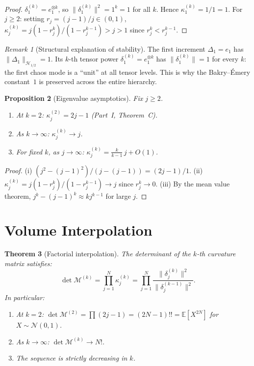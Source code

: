 \documentclass[11pt,a4paper]{article}
\theoremstyle{plain}
\newtheorem{theorem}{Theorem}[section]
\newtheorem{proposition}[theorem]{Proposition}
\theoremstyle{definition}
\theoremstyle{remark}
\newtheorem{remark}[theorem]{Remark}
\newcommand{\E}{\mathbb{E}}
\begin{document}
\begin{proof}
$\delta_1^{(k)} = e_1^{\otimes k}$, so
$\|\delta_1^{(k)}\|^2 = 1^k = 1$ for all $k$.
Hence $\kappa_1^{(k)} = 1/1 = 1$.
For $j \geq 2$: setting $r_j = (j{-}1)/j \in (0,1)$,
$\kappa_j^{(k)} = j(1-r_j^k)/(1-r_j^{k-1}) > j > 1$
since $r_j^k < r_j^{k-1}$.
\end{proof}

\begin{remark}[Structural explanation of stability]
\label{rem:stability}
The first increment $\Delta_1 = e_1$ has
$\|\Delta_1\|_{\mathcal{H}_{1/2}} = 1$.
Its $k$-th tensor power $\delta_1^{(k)} = e_1^{\otimes k}$
has $\|\delta_1^{(k)}\| = 1$ for every $k$:
the first chaos mode is a ``unit'' at all tensor levels.
This is why the Bakry--\'Emery constant~$1$ is preserved
across the entire hierarchy.
\end{remark}

\begin{proposition}[Eigenvalue asymptotics]
\label{prop:asymptotics}
Fix $j \geq 2$.
\begin{enumerate}[label=\textup{(\roman*)}]
\item At $k = 2$:
  $\kappa_j^{(2)} = 2j - 1$ (Part~I, Theorem~C).
\item As $k \to \infty$:
  $\kappa_j^{(k)} \to j$.
\item For fixed $k$, as $j \to \infty$:
  $\kappa_j^{(k)} = \frac{k}{k-1}\,j + O(1)$.
\end{enumerate}
\end{proposition}

\begin{proof}
(i) $(j^2-(j{-}1)^2)/(j-(j{-}1)) = (2j-1)/1$.
(ii) $\kappa_j^{(k)} = j(1-r_j^k)/(1-r_j^{k-1}) \to j$
since $r_j^k \to 0$.
(iii) By the mean value theorem,
$j^k - (j{-}1)^k \approx kj^{k-1}$ for large $j$.
\end{proof}


\section{Volume Interpolation}\label{sec:volume}

\begin{theorem}[Factorial interpolation]
\label{thm:volume}
The determinant of the $k$-th curvature matrix satisfies:
\begin{equation}\label{eq:det-formula}
  \det \mathcal{M}^{(k)}
  = \prod_{j=1}^N \kappa_j^{(k)}
  = \prod_{j=1}^N
    \frac{\|\delta_j^{(k)}\|^2}{\|\delta_j^{(k-1)}\|^2}.
\end{equation}
In particular:
\begin{enumerate}[label=\textup{(\roman*)}]
\item At $k = 2$:
  $\det \mathcal{M}^{(2)} = \prod(2j-1) = (2N{-}1)!!
  = \E[X^{2N}]$ for $X \sim \mathcal{N}(0,1)$.
\item As $k \to \infty$:
  $\det \mathcal{M}^{(k)} \to N!$.
\item The sequence is strictly decreasing in $k$.
\end{enumerate}
\end{theorem}
\end{document}
